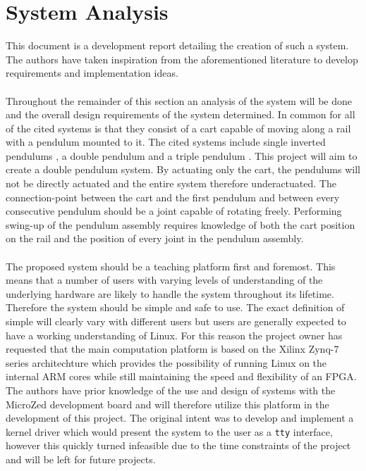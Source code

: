 \section{System Analysis}
This document is a development report detailing the creation of such a system.
The authors have taken inspiration from the aforementioned literature to develop requirements and implementation ideas.
\\~\\
Throughout the remainder of this section an analysis of the system will be done and the overall design requirements of the system determined.
In common for all of the cited systems is that they consist of a cart capable of moving along a rail with a pendulum mounted to it.
The cited systems include single inverted pendulums \cite{invertpendulum1} \cite{invertpendulum3}, a double pendulum \cite{doubleinvertpendulum} and a triple pendulum \cite{tripleinvertpendulum}.
This project will aim to create a double pendulum system.
By actuating only the cart, the pendulums will not be directly actuated and the entire system therefore underactuated.
The connection-point between the cart and the first pendulum and between every consecutive pendulum should be a joint capable of rotating freely.
Performing swing-up of the pendulum assembly requires knowledge of both the cart position on the rail and the position of every joint in the pendulum assembly.  
\\~\\
The proposed system should be a teaching platform first and foremost.
This means that a number of users with varying levels of understanding of the underlying hardware are likely to handle the system throughout its lifetime.
Therefore the system should be simple and safe to use.
The exact definition of simple will clearly vary with different users but users are generally expected to have a working understanding of Linux.
For this reason the project owner has requested that the main computation platform is based on the Xilinx Zynq-7 series architechture which provides the possibility of running Linux on the internal ARM cores while still maintaining the speed and flexibility of an FPGA.
The authors have prior knowledge of the use and design of systems with the MicroZed development board and will therefore utilize this platform in the development of this project. 
The original intent was to develop and implement a kernel driver which would present the system to the user as a \texttt{tty} interface, however this quickly turned infeasible due to the time constraints of the project and will be left for future projects.
